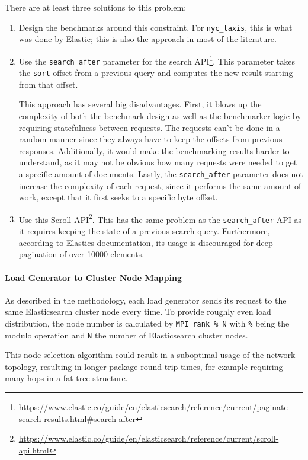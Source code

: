 There are at least three solutions to this problem:
\begin{enumerate}
  \item Design the benchmarks around this constraint. For \texttt{nyc\_taxis}, this is what was done by Elastic; this is also the approach in most of the literature.
  \item Use the \texttt{search\_after} parameter for the search API\footnote{\url{https://www.elastic.co/guide/en/elasticsearch/reference/current/paginate-search-results.html\#search-after}}. This parameter takes the \texttt{sort} offset from a previous query and computes the new result starting from that offset.

    This approach has several big disadvantages. First, it blows up the complexity of both the benchmark design as well as the benchmarker logic by requiring statefulness between requests. The requests can't be done in a random manner since they always have to keep the offsets from previous responses. Additionally, it would make the benchmarking results harder to understand, as it may not be obvious how many requests were needed to get a specific amount of documents. Lastly, the \texttt{search\_after} parameter does not increase the complexity of each request, since it performs the same amount of work, except that it first seeks to a specific byte offset.

  \item Use this Scroll API\footnote{\url{https://www.elastic.co/guide/en/elasticsearch/reference/current/scroll-api.html}}. This has the same problem as the \texttt{search\_after} API as it requires keeping the state of a previous search query. Furthermore, according to Elastics documentation, its usage is discouraged for deep pagination of over 10000 elements.
\end{enumerate}

\paragraph{Load Generator to Cluster Node Mapping} As described in the methodology, each load generator sends its request to the same Elasticsearch cluster node every time. To provide roughly even load distribution, the node number is calculated by \texttt{MPI\_rank \% N} with \texttt{\%} being the modulo operation and \texttt{N} the number of Elasticsearch cluster nodes.

This node selection algorithm could result in a suboptimal usage of the network topology, resulting in longer package round trip times, for example requiring many hops in a fat tree structure.\\


